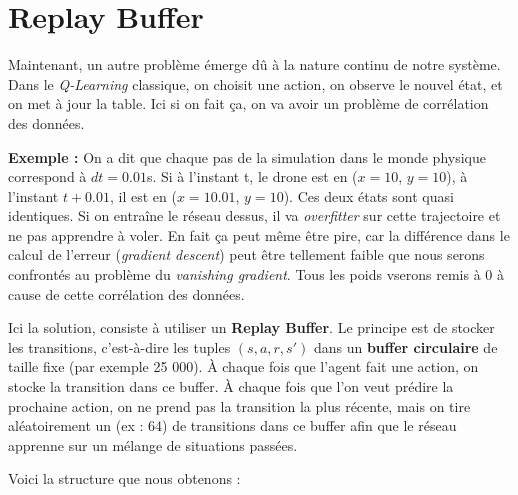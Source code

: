 \documentclass{article}
\begin{document}
\section{Replay Buffer}

Maintenant, un autre problème émerge dû à la nature continu de notre système. 
Dans le \textit{Q-Learning} classique, on choisit une action, on observe le nouvel état, et on met à jour la table. 
Ici si on fait ça, on va avoir un problème de corrélation des données.

\vspace{0.5cm}

\textbf{Exemple :}
On a dit que chaque pas de la simulation dans le monde physique correspond à $dt = 0.01$s.
Si à l'instant t, le drone est en ($x = 10$, $y = 10$), à l'instant $t + 0.01$, il est en ($x = 10.01$, $y = 10$).
Ces deux états sont quasi identiques. Si on entraîne le réseau dessus, il va \textit{overfitter} sur cette trajectoire et ne pas apprendre à voler.
En fait ça peut même être pire, car la différence dans le calcul de l'erreur (\textit{gradient descent}) peut être tellement faible 
que nous serons confrontés au problème du \textit{vanishing gradient}. Tous les poids vserons remis à $0$ à cause de cette corrélation des données.

\vspace{0.5cm}

Ici la solution, consiste à utiliser un \textbf{Replay Buffer}.
Le principe est de stocker les transitions, c'est-à-dire les tuples $(s, a, r, s')$ dans un \textbf{buffer circulaire} de taille fixe (par exemple 25 000).
À chaque fois que l'agent fait une action, on stocke la transition dans ce buffer.
À chaque fois que l'on veut prédire la prochaine action, on ne prend pas la transition la plus récente, 
mais on tire aléatoirement un  (ex : $64$) de transitions dans ce buffer 
afin que le réseau apprenne sur un mélange de situations passées.

Voici la structure que nous obtenons :
\end{document}
